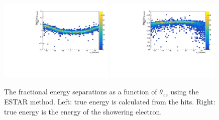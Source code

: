 \begin{figure}[h!]
    \centering
    \includegraphics[width = 0.49\textwidth]{figures-chap4/frac_res_vs_thetaXZ_cheating_electron_vertex_plane2_cut.pdf}
    \includegraphics[width = 0.49\textwidth]{figures-chap4/frac_res_vs_thetaXZ_showeringE_cheating_electron_vertex_plane2_cut.pdf}
    \caption[The fractional energy separation as a function of $\theta_{xz}$.]{The fractional energy separations as a function of $\theta_{xz}$ using the ESTAR method. Left: true energy is calculated from the hits. Right: true energy is the energy of the showering electron.}
    \label{fig:reconstruction_as_a_function_of_angle}
\end{figure}

